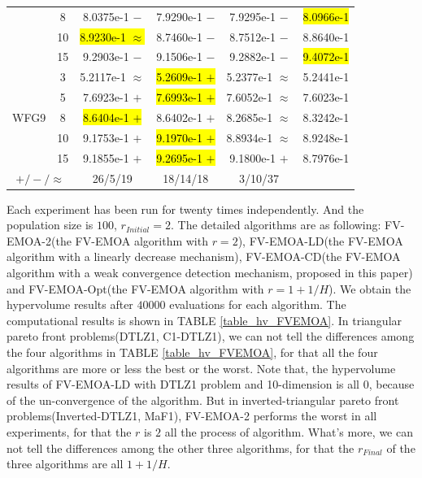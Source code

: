 \documentclass[conference]{IEEEtran}
\begin{document}
\begin{table}[htbp]
\begin{tabular}{cccccc}
  &8&8.0375e-1 $-$&7.9290e-1 $-$&7.9295e-1 $-$&\hl{8.0966e-1}\\
  &10&\hl{8.9230e-1 $\approx$}&8.7460e-1 $-$&8.7512e-1 $-$&8.8640e-1\\
  &15&9.2903e-1 $-$&9.1506e-1 $-$&9.2882e-1 $-$&\hl{9.4072e-1}\\
  \hline
  \multirow{5}{*}{WFG9}&3&5.2117e-1 $\approx$&\hl{5.2609e-1 $+$}&5.2377e-1 $\approx$&5.2441e-1\\
  &5&7.6923e-1 $+$&\hl{7.6993e-1 $+$}&7.6052e-1 $\approx$&7.6023e-1\\
  &8&\hl{8.6404e-1 $+$}&8.6402e-1 $+$&8.2685e-1 $\approx$&8.3242e-1\\
  &10&9.1753e-1 $+$&\hl{9.1970e-1 $+$}&8.8934e-1 $\approx$&8.9248e-1\\
  &15&9.1855e-1 $+$&\hl{9.2695e-1 $+$}&9.1800e-1 $+$&8.7976e-1\\
  \hline
  \multicolumn{2}{c}{$+/-/\approx$}&26/5/19&18/14/18&3/10/37&\\
  \bottomrule
  \end{tabular}
  \label{No Label}
  \end{table}
Each experiment has been run for twenty times independently. 
And the population size is $100$, $r_{Initial}=2$.
The detailed algorithms are as following: 
FV-EMOA-2(the FV-EMOA\cite{FVEMOA} algorithm with $r=2$),
FV-EMOA-LD(the FV-EMOA algorithm with a linearly decrease mechanism),
FV-EMOA-CD(the FV-EMOA algorithm with a weak convergence detection mechanism, proposed in this paper)
and FV-EMOA-Opt(the FV-EMOA algorithm with $r=1+1/H$).
We obtain the hypervolume results after $40000$ evaluations for each algorithm. 
The computational results is shown in TABLE \ref{table_hv_FVEMOA}.%
In triangular pareto front problems(DTLZ1, C1-DTLZ1), 
we can not tell the differences among the four algorithms in TABLE \ref{table_hv_FVEMOA},
for that all the four algorithms are more or less the best or the worst. 
Note that, the hypervolume results of FV-EMOA-LD with DTLZ1 problem and 10-dimension is all 0,
because of the un-convergence of the algorithm.
But in inverted-triangular pareto front problems(Inverted-DTLZ1, MaF1), 
FV-EMOA-2 performs the worst in all experiments,
for that the $r$ is $2$ all the process of algorithm. 
What's more, we can not tell the differences among the other three algorithms, 
for that the $r_{Final}$ of the three algorithms are all $1+1/H$.
\end{document}
